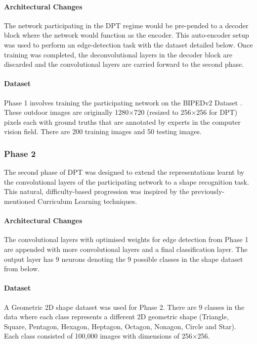 \paragraph{Architectural Changes}The network participating in the DPT regime would be pre-pended to a decoder block where the network would function as the encoder. This auto-encoder setup was used to perform an edge-detection task with the dataset detailed below. Once training was completed, the deconvolutional layers in the decoder block are discarded and the convolutional layers are carried forward to the second phase.
\paragraph{Dataset}Phase 1 involves training the participating network on the BIPEDv2 Dataset \cite{soria2023bipedv2}. These outdoor images are originally 1280$\times$720 (resized to 256$\times$256 for DPT) pixels each with ground truths that are annotated by experts in the computer vision field. There are 200 training images and 50 testing images.

\subsubsection*{Phase 2}\label{subsec-p2}
The second phase of DPT was designed to extend the representations learnt by the convolutional layers of the participating network to a shape recognition task. This natural, difficulty-based progression was inspired by the previously-mentioned Curriculum Learning techniques.

\paragraph{Architectural Changes}The convolutional layers with optimised weights for edge detection from Phase 1 are appended with more convolutional layers and a final classification layer. The output layer has 9 neurons denoting the 9 possible classes in the shape dataset from below. 

\paragraph{Dataset}A Geometric 2D shape dataset \cite{el2020shapes2d} was used for Phase 2. There are 9 classes in the data where each class represents a different 2D geometric shape (Triangle, Square, Pentagon, Hexagon, Heptagon, Octagon, Nonagon, Circle and Star). Each class consisted of 100,000 images with dimensions of 256$\times$256.

